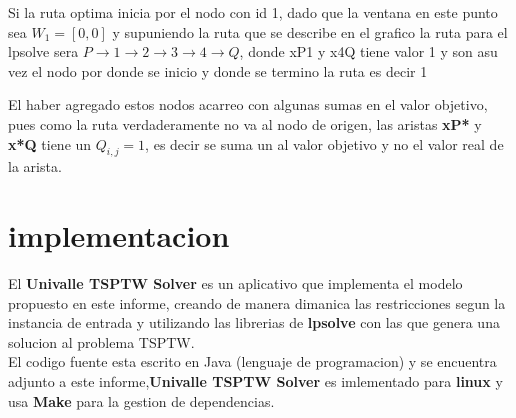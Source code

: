 \documentclass[journal, a4paper]{IEEEtran}
\begin{document}
Si la ruta optima inicia por el nodo con id 1, dado que la ventana en este punto sea \( W_{1}= [0,0]\) y supuniendo la ruta que se
describe en el grafico la ruta para el lpsolve sera \textbf{\(P \to 1\to 2\to 3\to 4\to Q\)}, 
donde xP1 y x4Q tiene valor 1 y son asu vez el nodo por donde se inicio y donde se termino la ruta es decir 1 \\
\begin{figure}[H]
\centering
{}
\end{figure}
El haber agregado estos nodos acarreo con algunas sumas en el valor objetivo, pues como la ruta verdaderamente 
no va al nodo de origen, las aristas \textbf{xP*} y \textbf{x*Q} tiene un \( Q_{i,j}=1 \), es decir se suma un
al valor objetivo y no el valor real de la arista.

\section{implementacion}
El \textbf{Univalle TSPTW Solver} es un aplicativo que implementa el modelo
propuesto en este informe, creando de manera dimanica las restricciones segun
la instancia de entrada y utilizando las librerias de \textbf{lpsolve} \cite{lpdef} 
con las que genera una solucion al problema TSPTW.\\
El codigo fuente esta escrito en Java (lenguaje de programacion)\cite{javadef} y se encuentra
adjunto a este informe,\textbf{Univalle TSPTW Solver} es imlementado para
\textbf{linux} y usa \textbf{Make} para la gestion de dependencias.
\end{document}
